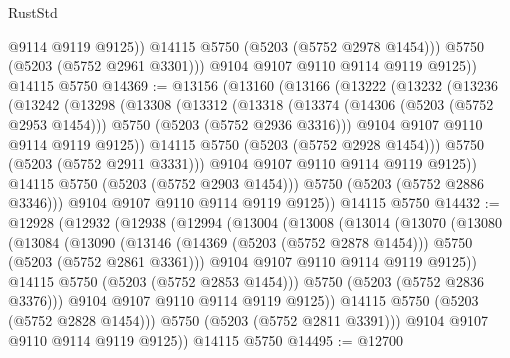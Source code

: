 \begin{lexlean}{RustStd}
\begin{coremodule}
                @9114
                @9119
                @9125))
            @14115
            @5750
            (@5203 (@5752 @2978 @1454)))
          @5750
          (@5203 (@5752 @2961 @3301)))
        @9104
        @9107
        @9110
        @9114
        @9119
        @9125))
    @14115
    @5750
@14369 := @13156
    (@13160
      (@13166
        (@13222
          (@13232
            (@13236
              (@13242
                (@13298
                  (@13308
                    (@13312
                      (@13318
                        (@13374
                          (@14306 (@5203 (@5752 @2953 @1454)))
                          @5750
                          (@5203 (@5752 @2936 @3316)))
                        @9104
                        @9107
                        @9110
                        @9114
                        @9119
                        @9125))
                    @14115
                    @5750
                    (@5203 (@5752 @2928 @1454)))
                  @5750
                  (@5203 (@5752 @2911 @3331)))
                @9104
                @9107
                @9110
                @9114
                @9119
                @9125))
            @14115
            @5750
            (@5203 (@5752 @2903 @1454)))
          @5750
          (@5203 (@5752 @2886 @3346)))
        @9104
        @9107
        @9110
        @9114
        @9119
        @9125))
    @14115
    @5750
@14432 := @12928
    (@12932
      (@12938
        (@12994
          (@13004
            (@13008
              (@13014
                (@13070
                  (@13080
                    (@13084
                      (@13090
                        (@13146
                          (@14369 (@5203 (@5752 @2878 @1454)))
                          @5750
                          (@5203 (@5752 @2861 @3361)))
                        @9104
                        @9107
                        @9110
                        @9114
                        @9119
                        @9125))
                    @14115
                    @5750
                    (@5203 (@5752 @2853 @1454)))
                  @5750
                  (@5203 (@5752 @2836 @3376)))
                @9104
                @9107
                @9110
                @9114
                @9119
                @9125))
            @14115
            @5750
            (@5203 (@5752 @2828 @1454)))
          @5750
          (@5203 (@5752 @2811 @3391)))
        @9104
        @9107
        @9110
        @9114
        @9119
        @9125))
    @14115
    @5750
@14495 := @12700

\end{coremodule}
\end{lexlean}
